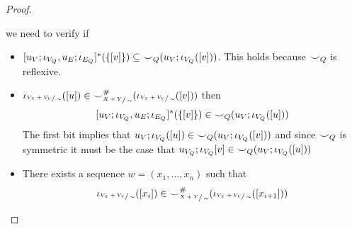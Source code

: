 \begin{proof}
\begin{enumerate}
\[       \]
       we need to verify if
       \begin{itemize}
        \item $[u_{V};\iota_{V_{Q}},u_{E};\iota_{E_{Q}}]^{*}(\{[v]\}) \subseteq {\smile}_{Q}(u_{V};\iota_{V_{Q}}([v]))$.
              This holds because ${\smile}_{Q}$ is reflexive.
        \item $\iota_{\sfrac{V_{X} + V_{Y}}{\sim}}([u]) \in {\smile}_{\sfrac{X+Y}{\sim}}^{{\#}}(\iota_{\sfrac{V_{X} + V_{Y}}{\sim}}([v]))$ then 
        \[
            [u_{V};\iota_{V_{Q}}, u_{E};\iota_{E_{Q}}]^{*}(\{[v]\}) \in {\smile}_{Q}(u_{V};\iota_{V_{Q}}([u]))
        \]
              The first bit implies that $u_{V};\iota_{V_{Q}}([u]) \in {\smile}_{Q}(u_{V};\iota_{V_{Q}}([v]))$ and since ${\smile}_{Q}$ is symmetric it must be the case that $u_{V_{Q}};\iota_{V_{Q}}[v] \in {\smile}_{Q}(u_{V};\iota_{V_{Q}}([u]))$
        \item There exists a sequence $w = (x_1, \ldots, x_n)$ such that 
        \[
            \iota_{\sfrac{V_{X} + V_{Y}}{\sim}}([x_i]) \in {\smile}_{\sfrac{X+Y}{\sim}}^{{\#}}(\iota_{\sfrac{V_{X} + V_{Y}}{\sim}}([x_{i+1}]))
        \] 
        

\end{itemize}
\end{enumerate}
\end{proof}
